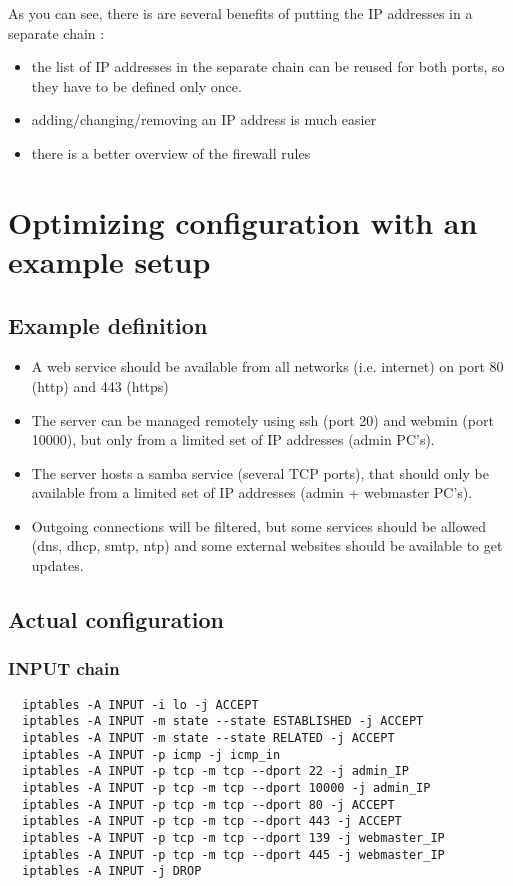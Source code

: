 \documentclass[a4paper,12pt]{article}
\begin{document}
As you can see, there is are several benefits of putting the IP addresses in a separate chain :
\begin{itemize}
    \item the list of IP addresses in the separate chain can be reused for both ports, so they have to be defined only once.
    \item adding/changing/removing an IP address is much easier
    \item there is a better overview of the firewall rules
\end{itemize}

\section{Optimizing configuration with an example setup}
\subsection{Example definition}
\begin{itemize}
  \item A web service should be available from all networks (i.e. internet) on port 80 (http) and 443 (https)
  \item The server can be managed remotely using ssh (port 20) and webmin (port 10000), but only from a limited set of IP addresses (admin PC's).
  \item The server hosts a samba service (several TCP ports), that should only be available from a limited set of IP addresses (admin + webmaster PC's).
  \item Outgoing connections will be filtered, but some services should be allowed (dns, dhcp, smtp, ntp) and some external websites should be available to get updates.
\end{itemize}

\subsection{Actual configuration}

\subsubsection{INPUT chain}

\begin{verbatim}
  iptables -A INPUT -i lo -j ACCEPT
  iptables -A INPUT -m state --state ESTABLISHED -j ACCEPT
  iptables -A INPUT -m state --state RELATED -j ACCEPT
  iptables -A INPUT -p icmp -j icmp_in
  iptables -A INPUT -p tcp -m tcp --dport 22 -j admin_IP
  iptables -A INPUT -p tcp -m tcp --dport 10000 -j admin_IP
  iptables -A INPUT -p tcp -m tcp --dport 80 -j ACCEPT
  iptables -A INPUT -p tcp -m tcp --dport 443 -j ACCEPT
  iptables -A INPUT -p tcp -m tcp --dport 139 -j webmaster_IP
  iptables -A INPUT -p tcp -m tcp --dport 445 -j webmaster_IP
  iptables -A INPUT -j DROP
\end{verbatim}
\end{document}
